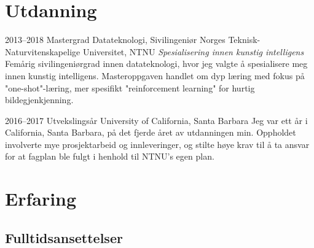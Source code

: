 \documentclass[]{friggeri-cv} %
\begin{document}
\section{Utdanning}

\begin{entrylist}


\entry
{2013--2018}
{Mastergrad {\normalfont Datateknologi, Sivilingeniør}}
{Norges Teknisk-Naturvitenskapelige Universitet, NTNU}
{\emph{Spesialisering innen kunstig intelligens} \\ Femårig sivilingeniørgrad innen datateknologi, hvor jeg valgte å spesialisere meg innen kunstig intelligens. Masteroppgaven handlet om dyp læring med fokus på "one-shot"-læring, mer spesifikt "reinforcement learning" for hurtig bildegjenkjenning.}


\entry
{2016--2017}
{Utvekslingsår}
{University of California, Santa Barbara}
{Jeg var ett år i California, Santa Barbara, på det fjerde året av utdanningen min. Oppholdet involverte mye prosjektarbeid og innleveringer, og stilte høye krav til å ta ansvar for at fagplan ble fulgt i henhold til NTNU's egen plan.}


\end{entrylist}


\section{Erfaring}



\subsection{Fulltidsansettelser}
\end{document}
